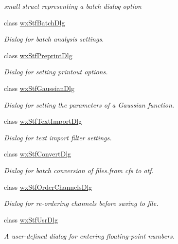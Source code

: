 \begin{DoxyCompactItemize}
\begin{DoxyCompactList}\small\item\em small struct representing a batch dialog option \item\end{DoxyCompactList}\item 
class \hyperlink{classwxStfBatchDlg}{wxStfBatchDlg}
\begin{DoxyCompactList}\small\item\em Dialog for batch analysis settings. \item\end{DoxyCompactList}\item 
class \hyperlink{classwxStfPreprintDlg}{wxStfPreprintDlg}
\begin{DoxyCompactList}\small\item\em Dialog for setting printout options. \item\end{DoxyCompactList}\item 
class \hyperlink{classwxStfGaussianDlg}{wxStfGaussianDlg}
\begin{DoxyCompactList}\small\item\em Dialog for setting the parameters of a Gaussian function. \item\end{DoxyCompactList}\item 
class \hyperlink{classwxStfTextImportDlg}{wxStfTextImportDlg}
\begin{DoxyCompactList}\small\item\em Dialog for text import filter settings. \item\end{DoxyCompactList}\item 
class \hyperlink{classwxStfConvertDlg}{wxStfConvertDlg}
\begin{DoxyCompactList}\small\item\em Dialog for batch conversion of files.from cfs to atf. \item\end{DoxyCompactList}\item 
class \hyperlink{classwxStfOrderChannelsDlg}{wxStfOrderChannelsDlg}
\begin{DoxyCompactList}\small\item\em Dialog for re-\/ordering channels before saving to file. \item\end{DoxyCompactList}\item 
class \hyperlink{classwxStfUsrDlg}{wxStfUsrDlg}
\begin{DoxyCompactList}\small\item\em A user-\/defined dialog for entering floating-\/point numbers. \item\end{DoxyCompactList}\end{DoxyCompactItemize}

